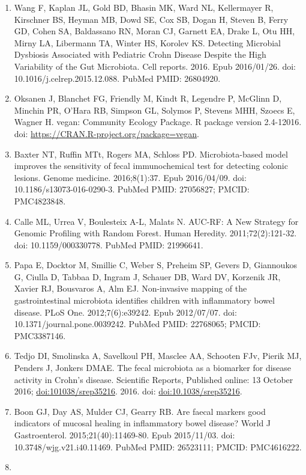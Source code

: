 \documentclass[11pt,]{article}
\begin{document}
\begin{enumerate}
\item
  Wang F, Kaplan JL, Gold BD, Bhasin MK, Ward NL, Kellermayer R,
  Kirschner BS, Heyman MB, Dowd SE, Cox SB, Dogan H, Steven B, Ferry GD,
  Cohen SA, Baldassano RN, Moran CJ, Garnett EA, Drake L, Otu HH, Mirny
  LA, Libermann TA, Winter HS, Korolev KS. Detecting Microbial Dysbiosis
  Associated with Pediatric Crohn Disease Despite the High Variability
  of the Gut Microbiota. Cell reports. 2016. Epub 2016/01/26. doi:
  10.1016/j.celrep.2015.12.088. PubMed PMID: 26804920.
\item
  Oksanen J, Blanchet FG, Friendly M, Kindt R, Legendre P, McGlinn D,
  Minchin PR, O'Hara RB, Simpson GL, Solymos P, Stevens MHH, Szoecs E,
  Wagner H. vegan: Community Ecology Package. R package version
  2.4-12016. doi: \url{https://CRAN.R-project.org/package=vegan}.
\item
  Baxter NT, Ruffin MTt, Rogers MA, Schloss PD. Microbiota-based model
  improves the sensitivity of fecal immunochemical test for detecting
  colonic lesions. Genome medicine. 2016;8(1):37. Epub 2016/04/09. doi:
  10.1186/s13073-016-0290-3. PubMed PMID: 27056827; PMCID: PMC4823848.
\item
  Calle ML, Urrea V, Boulesteix A-L, Malats N. AUC-RF: A New Strategy
  for Genomic Profiling with Random Forest. Human Heredity.
  2011;72(2):121-32. doi: 10.1159/000330778. PubMed PMID: 21996641.
\item
  Papa E, Docktor M, Smillie C, Weber S, Preheim SP, Gevers D,
  Giannoukos G, Ciulla D, Tabbaa D, Ingram J, Schauer DB, Ward DV,
  Korzenik JR, Xavier RJ, Bousvaros A, Alm EJ. Non-invasive mapping of
  the gastrointestinal microbiota identifies children with inflammatory
  bowel disease. PLoS One. 2012;7(6):e39242. Epub 2012/07/07. doi:
  10.1371/journal.pone.0039242. PubMed PMID: 22768065; PMCID:
  PMC3387146.
\item
  Tedjo DI, Smolinska A, Savelkoul PH, Masclee AA, Schooten FJv, Pierik
  MJ, Penders J, Jonkers DMAE. The fecal microbiota as a biomarker for
  disease activity in Crohn's disease. Scientific Reports, Published
  online: 13 October 2016; \textbar{} \url{doi:101038/srep35216}. 2016.
  doi: \url{doi:10.1038/srep35216}.
\item
  Boon GJ, Day AS, Mulder CJ, Gearry RB. Are faecal markers good
  indicators of mucosal healing in inflammatory bowel disease? World J
  Gastroenterol. 2015;21(40):11469-80. Epub 2015/11/03. doi:
  10.3748/wjg.v21.i40.11469. PubMed PMID: 26523111; PMCID: PMC4616222.
\item

\end{enumerate}
\end{document}
